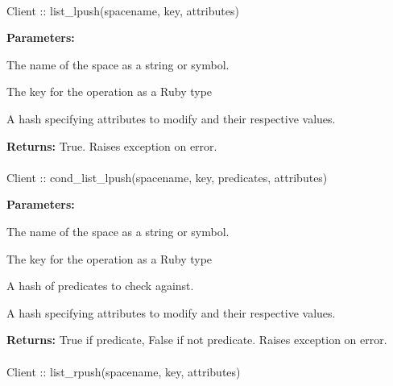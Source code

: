 \paragraph{}
\begin{ccode}
Client :: list_lpush(spacename, key, attributes)
\end{ccode}
\funcdesc 

\noindent\textbf{Parameters:}
\begin{description}[labelindent=\widthof{{\code{attributes}}},leftmargin=*,noitemsep,nolistsep,align=right]
\item[\code{spacename}] The name of the space as a string or symbol.
\item[\code{key}] The key for the operation as a Ruby type
\item[\code{attributes}] A hash specifying attributes to modify and their respective values.
\end{description}

\noindent\textbf{Returns:}
True.  Raises exception on error.

\paragraph{}
\begin{ccode}
Client :: cond_list_lpush(spacename, key, predicates, attributes)
\end{ccode}
\funcdesc 

\noindent\textbf{Parameters:}
\begin{description}[labelindent=\widthof{{\code{predicates}}},leftmargin=*,noitemsep,nolistsep,align=right]
\item[\code{spacename}] The name of the space as a string or symbol.
\item[\code{key}] The key for the operation as a Ruby type
\item[\code{predicates}] A hash of predicates to check against.
\item[\code{attributes}] A hash specifying attributes to modify and their respective values.
\end{description}

\noindent\textbf{Returns:}
True if predicate, False if not predicate.  Raises exception on error.

\paragraph{}
\begin{ccode}
Client :: list_rpush(spacename, key, attributes)
\end{ccode}
\funcdesc 

